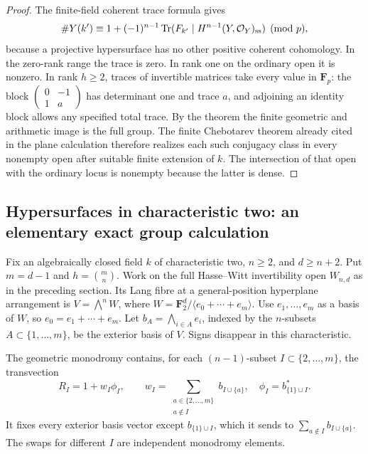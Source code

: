 \begin{proof}
The finite-field coherent trace formula gives
\[
 \#Y(k')\equiv 1+(-1)^{n-1}
       \operatorname{Tr}(F_{k'}\mid H^{n-1}(Y,\mathcal O_Y)_{\rm ss})
       \pmod p,
\]
because a projective hypersurface has no other positive
coherent cohomology.  In the zero-rank range the trace is zero.
In rank one on the ordinary open it is nonzero.
In rank $h\geq2$, traces of invertible matrices take every
value in $\mathbf F_p$: the block
$\begin{pmatrix}0&-1\\1&a\end{pmatrix}$ has determinant one
and trace $a$, and adjoining an identity block allows any
specified total trace.  By the theorem the finite geometric
and arithmetic image is the full group.  The finite
Chebotarev theorem already cited in the plane calculation
therefore realizes each such conjugacy class in every
nonempty open after suitable finite extension of $k$.
The intersection of that open with the ordinary locus is
nonempty because the latter is dense.
\end{proof}

\subsection{Hypersurfaces in characteristic two: an elementary exact group calculation}
\label{subsec:pn-char2-exact}

Fix an algebraically closed field $k$ of characteristic two,
$n\geq2$, and $d\geq n+2$.  Put $m=d-1$ and
$h=\binom{m}{n}$.  Work on the full Hasse--Witt invertibility
open $W_{n,d}$ as in the preceding section.  Its Lang fibre
at a general-position hyperplane arrangement is
$V=\bigwedge^n W$, where
$W=\mathbf F_2^d/\langle e_0+\cdots+e_m\rangle$.
Use $e_1,\ldots,e_m$ as a basis of $W$, so
$e_0=e_1+\cdots+e_m$.
Let $b_A=\bigwedge_{i\in A}e_i$, indexed by the $n$-subsets
$A\subset\{1,\ldots,m\}$, be the exterior basis of $V$.
Signs disappear in this characteristic.

\begin{lemma}\label{lem:char2-independent-quadric-swaps}
The geometric monodromy contains, for each
$(n-1)$-subset $I\subset\{2,\ldots,m\}$, the transvection
\begin{equation}\label{eq:char2-quadric-transvection}
 R_I=1+w_I\phi_I,\qquad
 w_I=\sum_{\substack{a\in\{2,\ldots,m\}\\a\notin I}}b_{I\cup\{a\}},
 \quad
 \phi_I=b_{\{1\}\cup I}^*.
\end{equation}
It fixes every exterior basis vector except
$b_{\{1\}\cup I}$, which it sends to
$\sum_{a\notin I}b_{I\cup\{a\}}$.
The swaps for different $I$ are independent monodromy elements.
\end{lemma}

